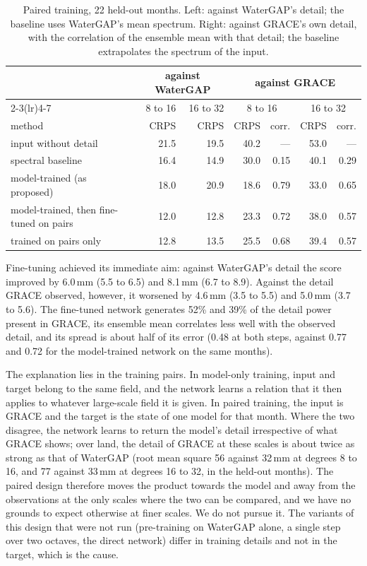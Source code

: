 \documentclass[11pt,a4paper]{article}
\begin{document}
\begin{table}[ht]
\centering\small
\caption{Paired training, 22 held-out months. Left: against WaterGAP's detail; the baseline
uses WaterGAP's mean spectrum. Right: against GRACE's own detail, with the correlation of the
ensemble mean with that detail; the baseline extrapolates the spectrum of the input.}
\label{tab:paired}
\begin{tabular}{lrrrrrr}
  \toprule
  & \multicolumn{2}{c}{against WaterGAP} & \multicolumn{4}{c}{against GRACE} \\
  \cmidrule(lr){2-3}\cmidrule(lr){4-7}
  & 8 to 16 & 16 to 32 & \multicolumn{2}{c}{8 to 16} & \multicolumn{2}{c}{16 to 32} \\
  method & CRPS & CRPS & CRPS & corr. & CRPS & corr. \\
  \midrule
  input without detail & 21.5 & 19.5 & 40.2 & --- & 53.0 & --- \\
  spectral baseline & 16.4 & 14.9 & 30.0 & 0.15 & 40.1 & 0.29 \\
  model-trained (as proposed) & 18.0 & 20.9 & 18.6 & 0.79 & 33.0 & 0.65 \\
  model-trained, then fine-tuned on pairs & 12.0 & 12.8 & 23.3 & 0.72 & 38.0 & 0.57 \\
  trained on pairs only & 12.8 & 13.5 & 25.5 & 0.68 & 39.4 & 0.57 \\
  \bottomrule
\end{tabular}
\end{table}

Fine-tuning achieved its immediate aim: against WaterGAP's detail the score improved by
6.0\,mm (5.5 to 6.5) and 8.1\,mm (6.7 to 8.9). Against the detail GRACE observed, however, it
worsened by 4.6\,mm (3.5 to 5.5) and 5.0\,mm (3.7 to 5.6). The fine-tuned network generates
52\% and 39\% of the detail power present in GRACE, its ensemble mean correlates less well
with the observed detail, and its spread is about half of its error (0.48 at both steps,
against 0.77 and 0.72 for the model-trained network on the same months).

The explanation lies in the training pairs. In model-only training, input and target belong
to the same field, and the network learns a relation that it then applies to whatever
large-scale field it is given. In paired training, the input is GRACE and the target is the
state of one model for that month. Where the two disagree, the network learns to return the
model's detail irrespective of what GRACE shows; over land, the detail of GRACE at these
scales is about twice as strong as that of WaterGAP (root mean square 56 against 32\,mm at
degrees 8 to 16, and 77 against 33\,mm at degrees 16 to 32, in the held-out months). The paired design therefore moves
the product towards the model and away from the observations at the only scales where the two
can be compared, and we have no grounds to expect otherwise at finer scales. We do not pursue
it. The variants of this design that were not run (pre-training on WaterGAP alone, a single
step over two octaves, the direct network) differ in training details and not in the target,
which is the cause.
\end{document}
